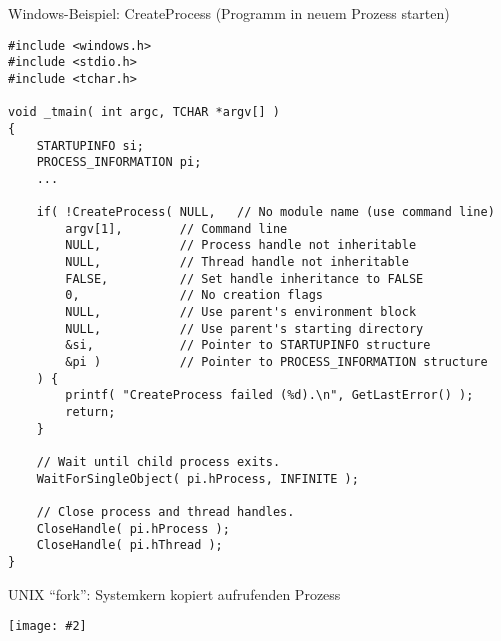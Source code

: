 \documentclass[utf8,9pt]{beamer}
\newcommand{\bild}[2][0.9\textwidth]{\texttt{[image: \#2]}}
\begin{document}
\begin{frame}[fragile]{}{}
  \begin{block}{Windows-Beispiel: CreateProcess (Programm in neuem
      Prozess starten) }
      \tiny\fontsize{6pt}{6pt}\selectfont
\begin{verbatim}
#include <windows.h>
#include <stdio.h>
#include <tchar.h>

void _tmain( int argc, TCHAR *argv[] )
{
    STARTUPINFO si;
    PROCESS_INFORMATION pi;
    ...

    if( !CreateProcess( NULL,   // No module name (use command line)
        argv[1],        // Command line
        NULL,           // Process handle not inheritable
        NULL,           // Thread handle not inheritable
        FALSE,          // Set handle inheritance to FALSE
        0,              // No creation flags
        NULL,           // Use parent's environment block
        NULL,           // Use parent's starting directory 
        &si,            // Pointer to STARTUPINFO structure
        &pi )           // Pointer to PROCESS_INFORMATION structure
    ) {
        printf( "CreateProcess failed (%d).\n", GetLastError() );
        return;
    }

    // Wait until child process exits.
    WaitForSingleObject( pi.hProcess, INFINITE );

    // Close process and thread handles. 
    CloseHandle( pi.hProcess );
    CloseHandle( pi.hThread );
}
\end{verbatim}
  \end{block}
\end{frame}




\begin{frame}{UNIX "`fork"': Systemkern kopiert aufrufenden Prozess}{}

  \bild[0.8\textwidth]{bilder/fork01.pdf}
\end{frame}
\end{document}
